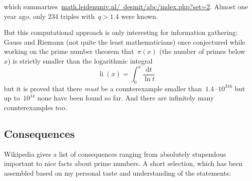 \documentclass[11pt, a4paper, openany, oneside, article]{memoir}
\newif\ifblog
\newif\iftex
\theoremstyle{definition}
\begin{document}
which summarizes~\iftex\href{http://www.math.leidenuniv.nl/~desmit/abc/index.php?set=2}{\texttt{math.leidenuniv.nl/~desmit/abc/index.php?set=2}}\fi\ifblog\href{http://www.math.leidenuniv.nl/~desmit/abc/index.php?set=2}{math.leidenuniv.nl/~desmit/abc/index.php?set=2}\fi. Almost one year ago, only 234 triples with~$q>1.4$ were known.

But this computational approach is only interesting for information gathering: Gauss and Riemann (not quite the least mathematicians) once conjectured while working on the prime number theorem that~$\pi(x)$ (the number of primes below~$x$) is strictly smaller than the logarithmic integral
\begin{equation}
  \operatorname{li}(x)=\int_0^x\frac{\mathrm{d}t}{\ln t}
\end{equation}
but it is proved that there \emph{must} be a counterexample smaller than~$1.4\cdot10^{316}$ but up to~$10^{14}$ none have been found so far. And there are infinitely many counterexamples too.

\subsection{Consequences}

Wikipedia gives a list of consequences ranging from absolutely stupendous important to nice facts about prime numbers. A short selection, which has been assembled based on my personal taste and understanding of the statements:
\end{document}
